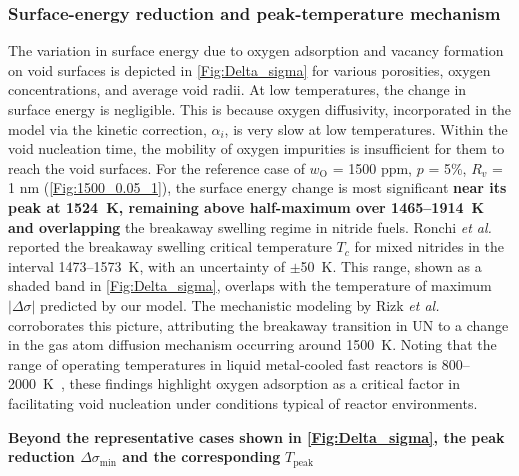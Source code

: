 \documentclass[preprint,12pt,sort&compress]{elsarticle}
\newcommand{\?}{\stackrel{?}{=}}
\providecommand{\DIFaddtex}[1]{{\bf #1}} %
\providecommand{\DIFdeltex}[1]{} %
\providecommand{\DIFaddbegin}{\protect\color{blue}} %
\providecommand{\DIFaddend}{\protect\color{black}} %
\providecommand{\DIFdelbegin}{\protect\color{red}} %
\providecommand{\DIFdelend}{\protect\color{black}} %
\providecommand{\DIFadd}[1]{\texorpdfstring{\DIFaddtex{#1}}{#1}} %
\providecommand{\DIFdel}[1]{\texorpdfstring{\DIFdeltex{#1}}{}} %
\begin{document}
\DIFaddbegin \subsubsection{\DIFadd{Surface-energy reduction and peak-temperature mechanism}}

\DIFaddend The variation in surface energy due to oxygen adsorption and vacancy formation on void surfaces is depicted in \cref{Fig:Delta_sigma} for various porosities, oxygen concentrations, and average void radii. At low temperatures, the change in surface energy is negligible. This is because oxygen diffusivity, incorporated in the model via the kinetic correction, $\alpha_i$, is very slow at low temperatures. Within the void nucleation time, the mobility of oxygen impurities is insufficient for them to reach the void surfaces. For the reference case of $w_\text{O}$ = 1500 ppm, $p$ = 5\%, $R_v$ = 1 nm (\cref{Fig:1500_0.05_1}), the surface energy change is most significant \DIFdelbegin \DIFdel{at intermediate temperatures (1300--1700~K), coinciding with }\DIFdelend \DIFaddbegin \DIFadd{near its peak at 1524~K, remaining above half-maximum over 1465--1914~K and overlapping }\DIFaddend the breakaway swelling regime in nitride fuels. Ronchi \textit{et al.}~\cite{Ronchi1978} reported the breakaway swelling critical temperature $T_c$ for mixed nitrides in the interval 1473--1573~K, with an uncertainty of $\pm$50~K. This range, shown as a shaded band in \cref{Fig:Delta_sigma}, overlaps with the temperature of maximum $|\Delta \sigma|$ predicted by our model. The mechanistic modeling by Rizk \textit{et al.}~\cite{Rizk2025} corroborates this picture, attributing the breakaway transition in UN to a change in the gas atom diffusion mechanism occurring around 1500~K. Noting that the range of operating temperatures in liquid metal-cooled fast reactors is 800--2000~K~\cite{Turos1990}, these findings highlight oxygen adsorption as a critical factor in facilitating void nucleation under conditions typical of reactor environments. \DIFdelbegin %

\DIFdel{The temperature dependence of $|\Delta\sigma|$ is governed by the competition between oxygen adsorption kinetics and bulk solubility. At low temperatures, diffusion is too slow for significant oxygen transport to void surfaces; at high temperatures, the increased bulk solubility of oxygen disfavors surface segregation. As a result, $|\Delta\sigma|$ exhibits a maximum at an intermediate temperature }\DIFdelend \DIFaddbegin \DIFadd{Beyond the representative cases shown in \cref{Fig:Delta_sigma}, the peak reduction $\Delta\sigma_\text{min}$ and the corresponding }\DIFaddend $T_\text{peak}$ \DIFdelbegin \DIFdel{.
}%
\end{document}
